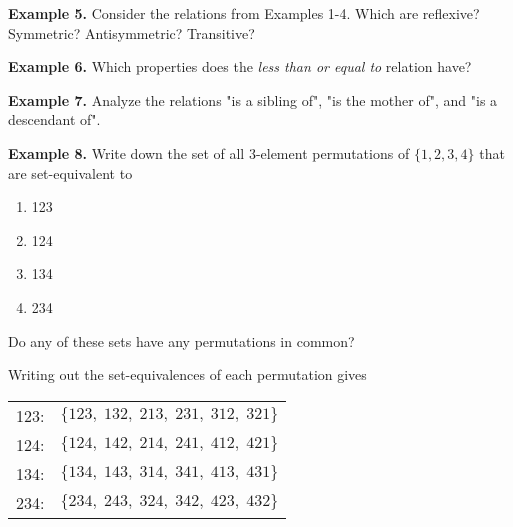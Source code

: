 \documentclass[12pt, letterpaper]{article}
\theoremstyle{definition}
\begin{document}
\vspace*{0.2in}\noindent
\textbf{Example 5.}
Consider the relations from Examples 1-4. Which are reflexive? Symmetric? Antisymmetric? Transitive?

\iffalse
    Set-equivalence:
    R because a list is a permutation of itself by def,
    S since lists are the same up to permutations,
    T is obvious.

    Neighbor:
    ~R since every number is 0 from itself,
    S because of absolute value,
    ~T since that's 2

    Subset:
    R since $S \subseteq S$ for any $S$
    A since $S \subseteq T$ and $T \subseteq S$ means $S = T$
    T since $S \subseteq T$ and $T \subseteq U$ means $S \subset U$

    Less-than:
    ~R
    ~S, ~A
    T
\fi

\vspace*{0.2in}\noindent
\textbf{Example 6.}
Which properties does the \emph{less than or equal to} relation have?

\vspace*{0.2in}\noindent
\textbf{Example 7.}
Analyze the relations "is a sibling of", "is the mother of", and "is a descendant of".

\vspace*{0.2in}\noindent
\textbf{Example 8.}
Write down the set of all 3-element permutations of $\{1,2,3,4\}$ that are set-equivalent to
\begin{multicols}{4}
    \begin{enumerate}[label=\textbf{\alph*.}]
        \item 123
        \item 124
        \item 134
        \item 234
    \end{enumerate}
\end{multicols}
Do any of these sets have any permutations in common?

\vspace*{0.2in}\noindent
Writing out the set-equivalences of each permutation gives

\begin{center}
    \begin{tabular}{l l}
        123:\qquad & $\{ 123,\; 132,\; 213,\; 231,\; 312,\; 321 \}$ \\
        124:\qquad & $\{ 124,\; 142,\; 214,\; 241,\; 412,\; 421 \}$ \\
        134:\qquad & $\{ 134,\; 143,\; 314,\; 341,\; 413,\; 431 \}$ \\
        234:\qquad & $\{ 234,\; 243,\; 324,\; 342,\; 423,\; 432 \}$
    \end{tabular}
\end{center}
\end{document}
